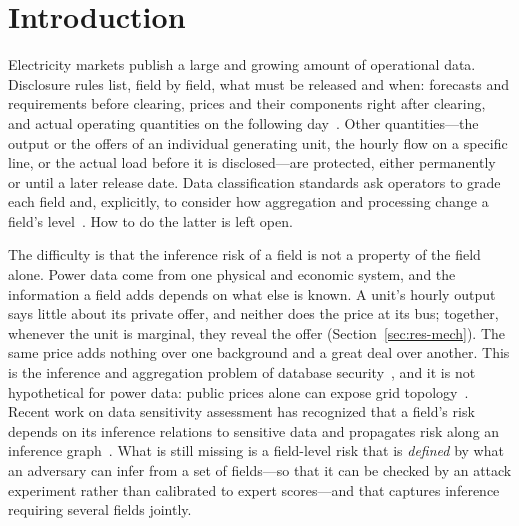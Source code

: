 \section{Introduction}\label{sec:intro}

Electricity markets publish a large and growing amount of operational data. Disclosure rules
list, field by field, what must be released and when: forecasts and requirements before
clearing, prices and their components right after clearing, and actual operating quantities on
the following day~\cite{nea2024disclosure}. Other quantities---the output or the offers of an
individual generating unit, the hourly flow on a specific line, or the actual load before it is
disclosed---are protected, either permanently or until a later release date. Data
classification standards ask operators to grade each field and, explicitly, to consider how
aggregation and processing change a field's level~\cite{gbt43697}. How to do the latter is
left open.

The difficulty is that the inference risk of a field is not a property of the field alone. Power
data come from one physical and economic system, and the information a field adds depends on what
else is known. A unit's hourly output says little about its private offer, and neither does the
price at its bus; together, whenever the unit is marginal, they reveal the offer
(Section~\ref{sec:res-mech}). The same price adds nothing over one background and a great deal over
another. This is the inference and aggregation problem of database
security~\cite{lunt1989aggregation,farkas2002inference}, and it is not hypothetical for power data:
public prices alone can expose grid topology~\cite{kekatos2014topology}. Recent work on data
sensitivity assessment has recognized that a field's risk depends on its inference relations to
sensitive data and propagates risk along an inference graph~\cite{hu2026ignn}. What is still missing
is a field-level risk that is \emph{defined} by what an adversary can infer from a set of
fields---so that it can be checked by an attack experiment rather than calibrated to expert
scores---and that captures inference requiring several fields jointly.

